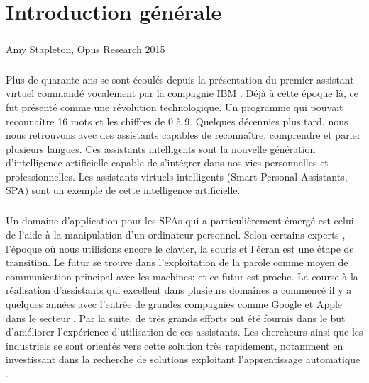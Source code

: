 \chapter*{Introduction générale}
\paragraph{}
\begin{chapquote}{Amy Stapleton, Opus Research 2015}
\end{chapquote}

\paragraph{}
Plus de quarante ans se sont écoulés depuis la présentation du premier assistant virtuel commandé vocalement par la compagnie IBM \citep{ibm_spa}. Déjà à cette époque là, ce fut présenté comme une révolution technologique. Un programme qui pouvait reconnaître 16 mots et les chiffres de 0 à 9. Quelques décennies plus tard, nous nous retrouvons avec des assistants capables de reconnaître, comprendre et parler plusieurs langues. Ces assistants intelligents sont la nouvelle génération d'intelligence artificielle capable de s'intégrer dans nos vies personnelles et professionnelles. Les assistants virtuels intelligents (Smart Personal Assistants, SPA) sont un exemple de cette	 intelligence artificielle. 

\paragraph{}
Un domaine d'application pour les SPAs qui a particulièrement émergé est celui de l'aide à la manipulation d'un ordinateur personnel. Selon certains experts \citep{spa_arch,virtualbutler,SPA-overview}, l'époque où nous utilisions encore le clavier, la souris et l'écran est une étape de transition. Le futur se trouve dans l'exploitation de la parole comme moyen de communication principal avec les machines; et ce futur est proche. La course à la réalisation d'assistants qui excellent dans plusieurs domaines a commencé il y a quelques années avec l'entrée de grandes compagnies comme Google et Apple dans le secteur \citep{spas_survey}. Par la suite, de très grands efforts ont été fournis dans le but d'améliorer l'expérience d'utilisation de ces assistants. Les chercheurs ainsi que les industriels se sont orientés vers cette solution très rapidement, notamment en investissant dans la recherche de solutions exploitant l'apprentissage automatique \citep{spas_survey}.

